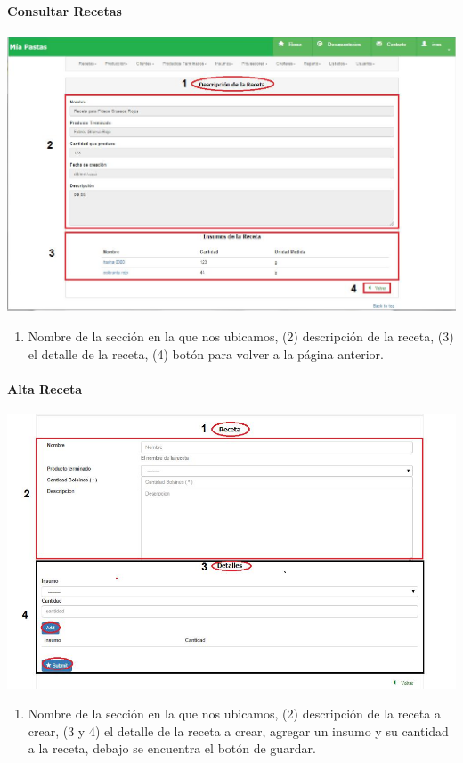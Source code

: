 \documentclass[letterpaper,10pt,english]{sphinxmanual}
\begin{document}
\paragraph{{}Consultar Recetas}
\label{recetas consultar::doc}\label{recetas consultar:consultar-recetas}
\includegraphics{receta_detalle.jpg}
\begin{enumerate}
\item {} 
Nombre de la sección en la que nos ubicamos, (2) descripción de la receta, (3) el detalle de la receta, (4) botón para volver a la página anterior.

\end{enumerate}


\paragraph{{}Alta Receta}
\label{recetas alta::doc}\label{recetas alta:alta-receta}
\includegraphics{receta_alta.jpg}
\begin{enumerate}
\item {} 
Nombre de la sección en la que nos ubicamos, (2) descripción de la receta a crear, (3 y 4) el detalle de la receta a crear, agregar un insumo y su cantidad a la receta,  debajo se encuentra el botón de guardar.

\end{enumerate}
\end{document}
